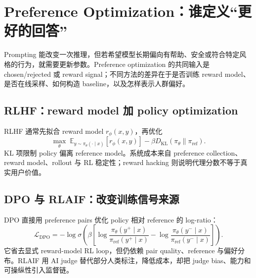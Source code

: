 \section{Preference Optimization：谁定义“更好的回答”}

Prompting 能改变一次推理，但若希望模型长期偏向有帮助、安全或符合特定风格的行为，就需要更新参数。Preference optimization 的共同输入是 chosen/rejected 或 reward signal；不同方法的差异在于是否训练 reward model、是否在线采样、如何构造 baseline，以及怎样表示人群偏好。

\subsection{RLHF：reward model 加 policy optimization}

RLHF 通常先拟合 reward model $r_{\phi}(x,y)$，再优化
\[
\max_{\theta}\;\mathbb{E}_{y\sim\pi_{\theta}(\cdot\mid x)}[r_{\phi}(x,y)]
-\beta D_{\mathrm{KL}}(\pi_{\theta}\|\pi_{\mathrm{ref}}).
\]
KL 项限制 policy 偏离 reference model。系统成本来自 preference collection、reward model、rollout 与 RL 稳定性；reward hacking 则说明代理分数不等于真实用户价值。




\subsection{DPO 与 RLAIF：改变训练信号来源}

DPO 直接用 preference pairs 优化 policy 相对 reference 的 log-ratio：
\[
\mathcal{L}_{\mathrm{DPO}}=-\log\sigma\!\left(\beta\left[
\log\frac{\pi_{\theta}(y^+\mid x)}{\pi_{\mathrm{ref}}(y^+\mid x)}-
\log\frac{\pi_{\theta}(y^-\mid x)}{\pi_{\mathrm{ref}}(y^-\mid x)}
\right]\right).
\]
它省去显式 reward-model RL loop，但仍依赖 pair quality、reference 与偏好分布。RLAIF 用 AI judge 替代部分人类标注，降低成本，却把 judge bias、能力和可操纵性引入监督链。





